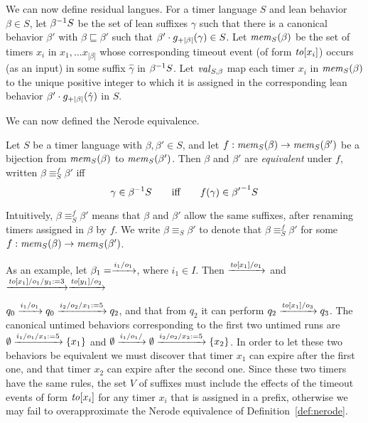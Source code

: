 We can now define residual langues. For a timer language $S$ and lean
behavior $\beta \in S$, let
$\suffixbehs{S}{\beta}$ be the set of lean suffixes $\gamma$ such that
there is a canonical behavior $\beta'$ with $\beta \sqsubseteq \beta'$ such that
$\beta'\cdot\suffmap{|\beta|}(\gamma) \in S$.
Let $\getmemorable{S}{\beta}$ be the set of timers $x_i$ in
$x_1 , \ldots x_{|\beta|}$ whose corresponding timeout event
(of form $\toevent{x_i}$) occurs (as an input) in some suffix $\hat{\gamma}$ in
$\suffixbehs{S}{\beta}$.
Let $\getassignment{S}{\beta}$ map each timer $x_i$ in
$\getmemorable{S}{\beta}$ to the unique positive integer to which it
is assigned in the corresponding
lean behavior $\beta'\cdot\suffmap{|\beta|}(\hat{\gamma})$
in $S$.

We can now defined the Nerode equivalence.

\begin{definition}
  \label{def:bj-nerode}
Let $S$ be a timer language with $\beta,\beta'\in S$,
and let $f : \getmemorable{S}{\beta} \to \getmemorable{S}{\beta'}$
be a bijection
from $\getmemorable{S}{\beta}$ to $\getmemorable{S}{\beta'}$.
Then $\beta$ and $\beta'$ are \emph{equivalent} under $f$, written
$\beta \equiv_{S}^f \beta'$ iff
\[
\gamma \in \suffixbehs{S}{\beta}
\qquad \mbox{iff} \qquad
f(\gamma) \in \suffixbehs{S}{\beta'}
\]
\end{definition}
Intuitively, $\beta \equiv_{S}^f \beta'$ means that $\beta$ and $\beta'$
allow the same suffixes, after renaming
timers assigned in $\beta$ by $f$.
We write $\beta \equiv_{S} \beta'$ to denote that
$\beta \equiv_{S}^f \beta'$ for some
$f : \getmemorable{S}{\beta} \to \getmemorable{S}{\beta'}$.

As an example, let
\(
\beta_1 =  \simpleuttrans{i_1}{o_1}
\), where $i_1 \in I$.
Then
$\simpleuttrans{\toevent{x_1}}{o_1}$ and
$\uttrans{\toevent{x_1}}{o_1}{y_1:= 3}\simpleuttrans{\toevent{y_1}}{o_2}$

\(
q_0 \simpleuttrans{i_1}{o_1} q_0 \uttrans{i_2}{o_2}{x_1:= 5} q_2
\),
and that from $q_2$ it can perform
\(
q_2 \simpleuttrans{\toevent{x_1}}{o_3} q_3
\).
The canonical untimed behaviors corresponding to the first two
untimed runs are
\(
\emptyset \uttrans{i_1}{o_1}{x_1:= 5} \set{x_1}
\)
and
\(
\emptyset \uttrans{i_1}{o_1}{} \emptyset \uttrans{i_2}{o_2}{x_2:= 5} \set{x_2}
\).
In order to let these two behaviors be equivalent we must discover that
timer $x_1$ can expire after the first one, and that
timer $x_2$ can expire after the second one. Since these two timers
have the same rules, the set $V$ of suffixes must
include the effects of the timeout events of form $\toevent{x_i}$ for any
timer $x_i$ that is assigned in a prefix, otherwise we
may fail to overapproximate the Nerode equivalence of Definition~\ref{def:nerode}.

